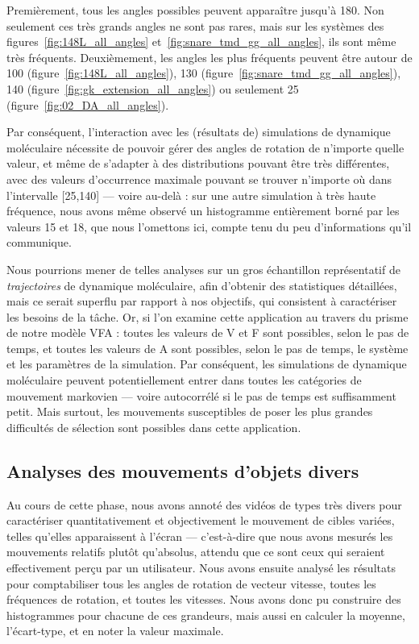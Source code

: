 	Premièrement, tous les angles possibles peuvent apparaître jusqu'à 180\textdegree{}. Non seulement ces très grands angles ne sont pas rares, mais sur les systèmes des figures~\ref{fig:148L_all_angles} et~\ref{fig:snare_tmd_gg_all_angles}, ils sont même très fréquents. Deuxièmement, les angles les plus fréquents peuvent être autour de 100\textdegree{} (figure~\ref{fig:148L_all_angles}), 130\textdegree{} (figure~\ref{fig:snare_tmd_gg_all_angles}), 140\textdegree{} (figure~\ref{fig:gk_extension_all_angles}) ou seulement 25\textdegree{} (figure~\ref{fig:02_DA_all_angles}).
	
	Par conséquent, l'interaction avec les (résultats de) simulations de dynamique moléculaire nécessite de pouvoir gérer des angles de rotation de n'importe quelle valeur, et même de s'adapter à des distributions pouvant être très différentes, avec des valeurs d'occurrence maximale pouvant se trouver n'importe où dans l'intervalle [25\textdegree{},140\textdegree{}] --- voire au-delà : sur une autre simulation à très haute fréquence, nous avons même observé un histogramme entièrement borné par les valeurs 15\textdegree{} et 18\textdegree{}, que nous l'omettons ici, compte tenu du peu d'informations qu'il communique.
	
	Nous pourrions mener de telles analyses sur un gros échantillon représentatif de \emph{trajectoires} de dynamique moléculaire, afin d'obtenir des statistiques détaillées, mais ce serait superflu par rapport à nos objectifs, qui consistent à caractériser les besoins de la tâche. Or, si l'on examine cette application au travers du prisme de notre modèle VFA : toutes les valeurs de V et F sont possibles, selon le pas de temps, et toutes les valeurs de A sont possibles, selon le pas de temps, le système et les paramètres de la simulation. Par conséquent, les simulations de dynamique moléculaire peuvent potentiellement entrer dans toutes les catégories de mouvement markovien --- voire autocorrélé si le pas de temps est suffisamment petit. Mais surtout, les mouvements susceptibles de poser les plus grandes difficultés de sélection sont possibles dans cette application.
	
	\FloatBarrier \subsection{Analyses des mouvements d'objets divers}
	Au cours de cette phase, nous avons annoté des vidéos de types très divers pour caractériser quantitativement et objectivement le mouvement de cibles variées, telles qu'elles apparaissent à l'écran --- c'est-à-dire que nous avons mesurés les mouvements relatifs plutôt qu'absolus, attendu que ce sont ceux qui seraient effectivement perçu par un utilisateur. Nous avons ensuite analysé les résultats pour comptabiliser tous les angles de rotation de vecteur vitesse, toutes les fréquences de rotation, et toutes les vitesses. Nous avons donc pu construire des histogrammes pour chacune de ces grandeurs, mais aussi en calculer la moyenne, l'écart-type, et en noter la valeur maximale.
	

